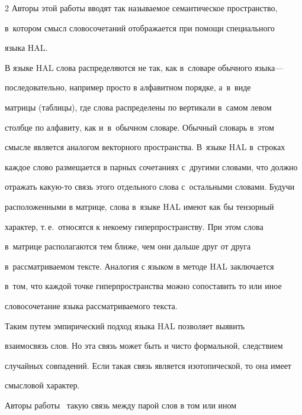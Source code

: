 \begin{multicols}{2}
Авторы этой работы вводят так называемое семантическое пространство, 


в~котором смысл словосочетаний отображается при помощи специального 


языка HAL.


    


    В языке HAL слова распределяются не так, как в~словаре обычного языка--- 


последовательно, например просто в алфавитном порядке, а~в~виде\linebreak  


мат\-ри\-цы (таблицы), где слова распределены по вертикали в~самом левом 


столб\-це по алфавиту, как и~в~обычном словаре. Обычный словарь в~этом 


смыс\-ле является аналогом векторного пространства. В~языке HAL в~строках 


каждое слово размещается в пар\-ных сочетаниях с~другими словами, что должно 


отражать ка\-кую-то связь этого отдельного слова с~остальными словами. Будучи 


расположенными в мат\-ри\-це, слова в~языке HAL имеют как бы тензорный 


характер, т.\,е.\ относятся к некоему гиперпространству. При этом слова 


в~мат\-ри\-це располагаются тем ближе, чем они дальше друг от друга  


в~рас\-смат\-ри\-ва\-емом текс\-те. Аналогия с языком в методе HAL заключается 


в~том, что каж\-дой точке гиперпространства можно сопоставить то или иное 


словосочетание языка рас\-смат\-ри\-ва\-емо\-го текста.


    


    Таким путем эмпирический подход языка HAL позволяет выявить 


взаимосвязь слов. Но эта связь может быть и чисто формальной, следствием 


случайных совпадений. Если такая связь является изотопической, то она имеет 


смысловой характер. 


    


    Авторы работы~\cite{6-an} такую связь между парой слов в том или ином 



\end{multicols}
